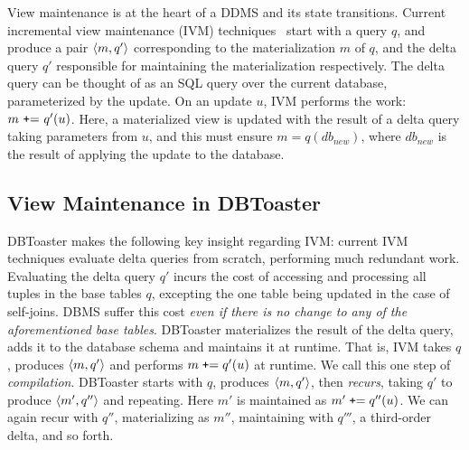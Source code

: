 \label{sec:compilation}

View maintenance is at the heart of a DDMS and its state transitions. Current
incremental view maintenance (IVM)
techniques~\cite{roussopoulos-tods:91,griffin-sigmod:95,zhou-icde:07,zhou-vldb:07}
start with a query $q$, and produce a pair ${\langle m,q'\rangle}$ corresponding to the
materialization $m$ of $q$, and the delta query $q'$ responsible for maintaining the
materialization respectively. The delta query can be thought of as an
SQL query over the current database, parameterized by the update.
On an update $u$, IVM performs the work: $m \mbox{
{\tt+}= } q'(u)$. Here, a materialized view is updated with the result of a
delta query taking parameters from $u$, and this must ensure $m = q(db_{new})$,
where $db_{new}$ is the result of applying the update to the database.

\subsection{View Maintenance in DBToaster}
DBToaster makes the following key insight regarding IVM: current IVM techniques
evaluate delta queries from scratch, performing much redundant work. Evaluating the delta
query $q'$ incurs the cost of accessing and processing all tuples in the base
tables $q$, excepting the one table being updated in the case of self-joins. DBMS suffer this cost
\textit{even if there is no change to any of the aforementioned base tables}.
DBToaster materializes the result of the delta query, adds it to the database
schema and maintains it at runtime.
That is, IVM takes $q$, produces ${\langle m,q'\rangle}$ and performs
$m \; \mbox{{\tt +}=} \; q'(u)$ at runtime. We call this one step of
\textit{compilation}. DBToaster starts with $q$, produces
${\langle m,q'\rangle}$, then \textit{recurs}, taking $q'$ to produce ${\langle m', q''\rangle}$
and repeating. Here $m'$ is maintained as $m' \; \mbox{{\tt +}=} \; q''(u)$.
We can again recur with $q''$, materializing as $m''$, maintaining with
$q'''$, a third-order delta, and so forth.


